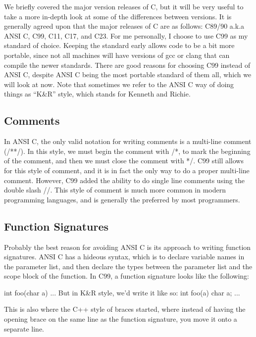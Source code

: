 \documentclass{article}
\begin{document}
We briefly covered the major version releases of C, but it will be very useful to take a more in-depth look
at some of the differences between versions. It is generally agreed upon that the major releases of C are as
follows: C89/90 a.k.a ANSI C, C99, C11, C17, and C23. For me personally, I choose to use C99 as my standard
of choice. Keeping the standard early allows code to be a bit more portable, since not all machines will have
versions of gcc or clang that can compile the newer standards. There are good reasons for choosing C99 instead
of ANSI C, despite ANSI C being the most portable standard of them all, which we will look at now. Note that
sometimes we refer to the ANSI C way of doing things as “K&R” style, which stands for Kenneth and Richie.

\subsection{Comments}

In ANSI C, the only valid notation for writing comments is a multi-line comment (/**/). In this style, we
must begin the comment with /*, to mark the beginning of the comment, and then we must close the comment with
*/. C99 still allows for this style of comment, and it is in fact the only way to do a proper multi-line
comment. However, C99 added the ability to do single line comments using the double slash //. This style of
comment is much more common in modern programming languages, and is generally the preferred by most
programmers.

\subsection{Function Signatures}

Probably the best reason for avoiding ANSI C is its approach to writing function signatures. ANSI C has a
hideous syntax, which is to declare variable names in the parameter list, and then declare the types between
the parameter list and the scope block of the function. In C99, a function signature looks like the following:

\begin{cblk}
int foo(char a) {
    ...
}
But in K&R style, we’d write it like so:
int foo(a)
char a;
{
     ...
}
\end{cblk}

This is also where the C++ style of braces started, where instead of having the opening brace on the same
line as the function signature, you move it onto a separate line.
\end{document}
